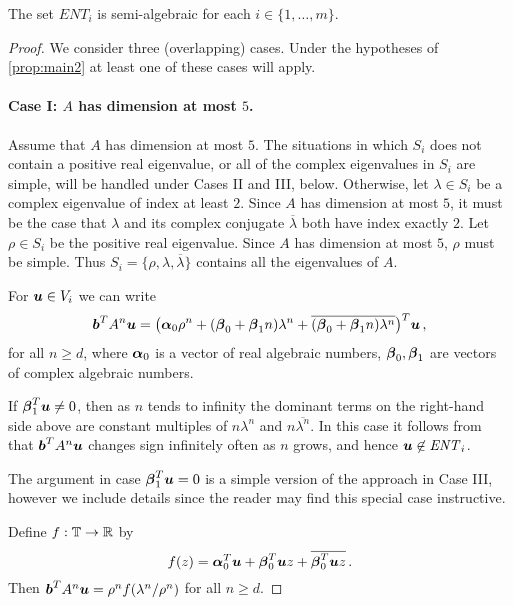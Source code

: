 \begin{proposition}
The set $\mathit{ENT}_i$ is semi-algebraic for each $i\in \{1,\ldots,m\}$.
\label{prop:semi-alg}
\end{proposition}
\begin{proof}
  We consider three (overlapping) cases.  Under the hypotheses of
  \cref{prop:main2} at least one of these cases will apply.

\paragraph{Case I: $A$ has dimension at most $5$.}
Assume that $A$ has dimension at most $5$.  The situations in which
$S_i$ does not contain a positive real eigenvalue, or
all of the complex eigenvalues in $S_i$ are simple, will be handled
under Cases II and III, below.  Otherwise, let $\lambda\in S_i$ be a complex
eigenvalue of index at least $2$.  Since $A$ has dimension at most
$5$, it must be the case that $\lambda$ and its complex conjugate
$\overline{\lambda}$ both have index exactly $2$.  Let $\rho \in S_i$
be the positive real eigenvalue.  Since
$A$ has dimension at most $5$, $\rho$ must be simple.  Thus
$S_i=\{\rho,\lambda,\overline{\lambda}\}$ contains all the eigenvalues
of $A$.

For $\boldsymbol{u}\in V_i$ we can write
\begin{align*}
\myvector{b}^TA^n\myvector{u} =
\big(\myvector{\alpha}_0\rho^n  + (\myvector{\beta}_0+ \myvector{\beta}_1n)\lambda^n
 + \overline{(\myvector{\beta}_0+\myvector{\beta}_1n)
\lambda^n}\big)^T\myvector{u} \, ,
\label{eq:small}
\end{align*}
for all $n\geq d$,
where $\boldsymbol{\alpha}_0$ is a vector of real algebraic numbers,
$\boldsymbol{\beta}_0,\boldsymbol{\beta}_1$ are vectors of complex
algebraic numbers.

If $\boldsymbol{\beta}_1^T\boldsymbol{u}\neq 0$, then as $n$ tends to
infinity the dominant terms on the right-hand side above are constant
multiples of $n\lambda^n$ and $n\overline{\lambda^n}$.  In this case
it follows from~\cite[Lemma 4]{Bra06} that
$\boldsymbol{b}^TA^n\boldsymbol{u}$ changes sign infinitely often as
$n$ grows, and hence $\boldsymbol{u}\not\in\mathit{ENT}_i$.

The argument in case $\boldsymbol{\beta}_1^T\boldsymbol{u}=0$ is a
simple version of the approach in Case III, however we include details
since the reader may find this special case instructive.

Define $f:\mathbb{T}\rightarrow\mathbb{R}$ by
\[ f(z)=\boldsymbol{\alpha}_0^T\boldsymbol{u}+
\boldsymbol{\beta}_0^T\boldsymbol{u}z+
\overline{\boldsymbol{\beta}_0^T\boldsymbol{u}z} \, .\]
Then $\boldsymbol{b}^TA^n\boldsymbol{u} = \rho^n f(\lambda^n/\rho^n)$ for all $n\geq d$.


\end{proof}
